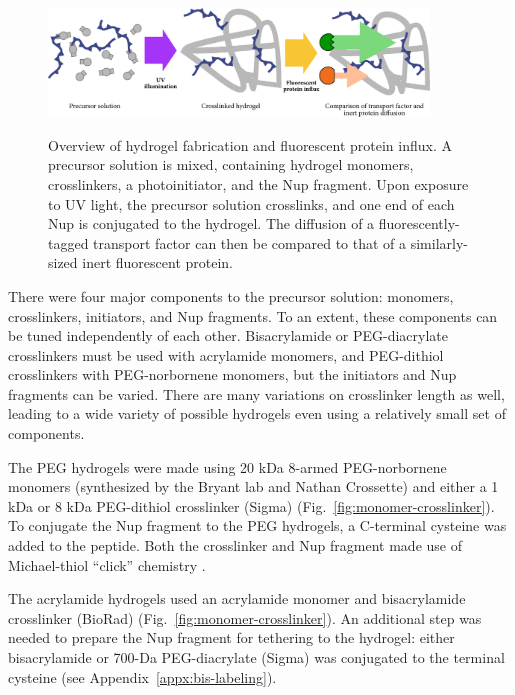 \begin{figure}
\caption[Hydrogels for protein separation.]{Overview of hydrogel fabrication and fluorescent protein influx. A precursor solution is mixed, containing hydrogel monomers, crosslinkers, a photoinitiator, and the Nup fragment.  Upon exposure to UV light, the precursor solution crosslinks, and one end of each Nup is conjugated to the hydrogel.  The diffusion of a fluorescently-tagged transport factor can then be compared to that of a similarly-sized inert fluorescent protein.}
\centering
\includegraphics[width=0.9\textwidth]{figs/ch03/precursor}
\label{fig:precursor}
\end{figure}

There were four major components to the precursor solution: monomers, crosslinkers, initiators, and Nup fragments.  To an extent, these components can be tuned independently of each other.  Bisacrylamide or PEG-diacrylate crosslinkers must be used with acrylamide monomers, and PEG-dithiol crosslinkers with PEG-norbornene monomers, but the initiators and Nup fragments can be varied.  There are many variations on crosslinker length as well, leading to a wide variety of possible hydrogels even using a relatively small set of components.

The PEG hydrogels were made using 20 kDa 8-armed PEG-norbornene monomers (synthesized by the Bryant lab and Nathan Crossette) and either a 1 kDa or 8 kDa PEG-dithiol crosslinker (Sigma) (Fig.~\ref{fig:monomer-crosslinker}).  To conjugate the Nup fragment to the PEG hydrogels, a C-terminal cysteine was added to the peptide.  Both the crosslinker and Nup fragment made use of Michael-thiol ``click'' chemistry \cite{chatani14}\cite{nair14}.

The acrylamide hydrogels used an acrylamide monomer and bisacrylamide crosslinker (BioRad) (Fig.~\ref{fig:monomer-crosslinker}).  An additional step was needed to prepare the Nup fragment for tethering to the hydrogel: either bisacrylamide or 700-Da PEG-diacrylate (Sigma) was conjugated to the terminal cysteine (see Appendix~\ref{appx:bis-labeling}).

